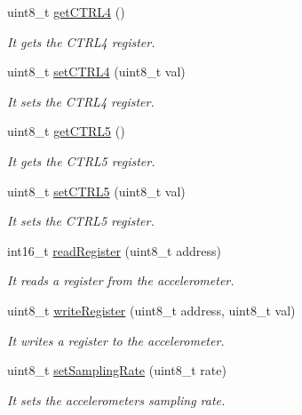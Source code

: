 \begin{DoxyCompactItemize}
uint8\+\_\+t \hyperlink{class_wasp_a_c_c_a5baed21e9c8ee0b8b758258fca69e962}{get\+C\+T\+R\+L4} ()
\begin{DoxyCompactList}\small\item\em It gets the C\+T\+R\+L4 register. \end{DoxyCompactList}\item 
uint8\+\_\+t \hyperlink{class_wasp_a_c_c_ae41d75c0214bafcc82b02eba8c90dfde}{set\+C\+T\+R\+L4} (uint8\+\_\+t val)
\begin{DoxyCompactList}\small\item\em It sets the C\+T\+R\+L4 register. \end{DoxyCompactList}\item 
uint8\+\_\+t \hyperlink{class_wasp_a_c_c_a4033f80b73a0abddade3c2f229939983}{get\+C\+T\+R\+L5} ()
\begin{DoxyCompactList}\small\item\em It gets the C\+T\+R\+L5 register. \end{DoxyCompactList}\item 
uint8\+\_\+t \hyperlink{class_wasp_a_c_c_aae5cc9234f01976dd8423a4356c7966f}{set\+C\+T\+R\+L5} (uint8\+\_\+t val)
\begin{DoxyCompactList}\small\item\em It sets the C\+T\+R\+L5 register. \end{DoxyCompactList}\item 
int16\+\_\+t \hyperlink{class_wasp_a_c_c_ac2dfe7f3b89fdf9ba318738243379db7}{read\+Register} (uint8\+\_\+t address)
\begin{DoxyCompactList}\small\item\em It reads a register from the accelerometer. \end{DoxyCompactList}\item 
uint8\+\_\+t \hyperlink{class_wasp_a_c_c_a0e6c012e4f79b9407af0c65cda91a599}{write\+Register} (uint8\+\_\+t address, uint8\+\_\+t val)
\begin{DoxyCompactList}\small\item\em It writes a register to the accelerometer. \end{DoxyCompactList}\item 
uint8\+\_\+t \hyperlink{class_wasp_a_c_c_a582a0976824a854a309f0649c25a9ab3}{set\+Sampling\+Rate} (uint8\+\_\+t rate)
\begin{DoxyCompactList}\small\item\em It sets the accelerometer\textquotesingle{}s sampling rate. \end{DoxyCompactList}\item 

\end{DoxyCompactItemize}
